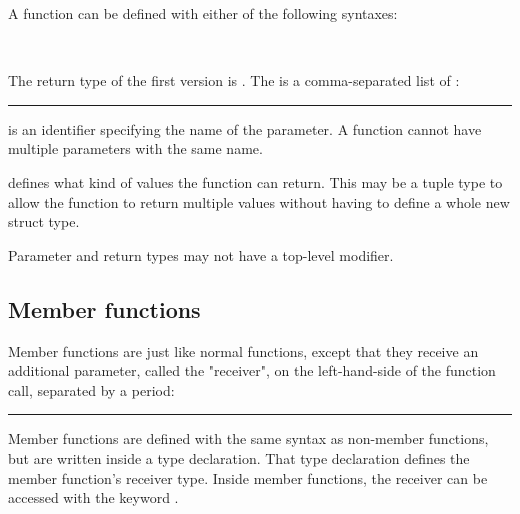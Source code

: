 A function can be defined with either of the following syntaxes:

\begin{grammar}
  \code{(}  \code{)} \code{\{}  \code{\}}\\
  \code{(}  \code{)} \code{->}  \code{\{}  \code{\}}
\end{grammar}

The return type of the first version is . The
 is a comma-separated list of
:

\begin{grammar}
\rule{parameter}  \code{:} 
\end{grammar}

 is an identifier specifying the name of the
parameter. A function cannot have multiple parameters with the same name.

 defines what kind of values the function can return.
This may be a tuple type to allow the function to return multiple values without
having to define a whole new struct type.

Parameter and return types may not have a top-level  modifier.

\subsection{Member functions}

Member functions are just like normal functions, except that they receive an
additional parameter, called the "receiver", on the left-hand-side of the
function call, separated by a period:

\begin{grammar}
\rule{member-function-call}    \code{(}  \code{)}
\end{grammar}

Member functions are defined with the same syntax as non-member functions, but
are written inside a type declaration. That type declaration defines the member
function's receiver type. Inside member functions, the receiver can be accessed
with the keyword .

